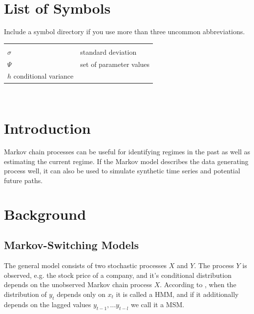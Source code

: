 \documentclass[11pt,a4paper]{article}
\begin{document}
\section*{List of Symbols} 
\noindent Include a symbol directory if you use more than three uncommon abbreviations.
	\begin{tabular}{l l}
		\textbf{} & \\
		$\sigma$ & standard deviation\\
		$\Psi$ & set of parameter values \\
		$h$ conditional variance
	\end{tabular}\\ \vspace{1cm}


\newpage


\pagestyle{fancy}						
\fancyhf{}								
\fancyhead[R]{}							 
\renewcommand{\headrulewidth}{0pt}	 
\fancyfoot[R]{\thepage}				 
\renewcommand{\footrulewidth}{0pt}	 
\onehalfspacing	
\section{Introduction}
Markov chain processes can be useful for identifying regimes in the past as well as estimating the current regime. %
If the Markov model describes the data generating process well, it can also be used to simulate synthetic time series and potential future paths. %

\section{Background}
\subsection{Markov-Switching Models}
The general model consists of two stochastic processes $X$ and $Y$. The process $Y$ is observed, e.g. the stock price of a company, and it's conditional distribution depends on the unobserved Markov chain process $X$. According to \cite{an_identifiability_2013}, when the distribution of $y_t$ depends only on $x_t$ it is called a \ac{HMM}, and if it additionally depends  on the lagged values $y_{t-1}, ... y_{t-l}$ we call it a \ac{MSM}.
\end{document}
